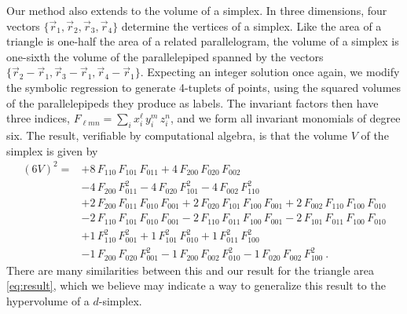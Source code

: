 \documentclass[10pt]{article}
\newcommand{\secbreak}{\bigskip{\centering\footnotesize $\triangle~~~\triangle~~~\triangle$\par}\bigskip\noindent}
\begin{document}
Our method also extends to the volume of a simplex. In three dimensions, four vectors $\{ \vec{r}_1, \vec{r}_2, \vec{r}_3, \vec{r}_4 \}$ determine the vertices of a simplex. 
Like the area of a triangle is one-half the area of a related parallelogram, the volume of a simplex is one-sixth the volume of the parallelepiped spanned by the vectors $\{ \vec{r}_2 - \vec{r}_1, \vec{r}_3 - \vec{r}_1, \vec{r}_4 - \vec{r}_1 \}$. 
Expecting an integer solution once again, we modify the symbolic regression to generate 4-tuplets of points, using the squared volumes of the parallelepipeds they produce as labels.
The invariant factors then have three indices, $F_{\ell m n} = \sum_i x_i^\ell \, y_i^m \, z_i^n$, and we form all invariant monomials of degree six.
The result, verifiable by computational algebra, is that the volume $V$ of the simplex is given by
\begin{align}
(6 V)^2 = &
+8 \, F_{110} \, F_{101} \, F_{011}
+4 \, F_{200} \, F_{020} \, F_{002}
\nonumber \\ &
-4 \, F_{200} \, F_{011}^2
-4 \, F_{020} \, F_{101}^2
-4 \, F_{002} \, F_{110}^2
\nonumber \\ &
+2 \, F_{200} \, F_{011} \, F_{010} \, F_{001}
+2 \, F_{020} \, F_{101} \, F_{100} \, F_{001}
+2 \, F_{002} \, F_{110} \, F_{100} \, F_{010}
\nonumber \\ &
-2 \, F_{110} \, F_{101} \, F_{010} \, F_{001}
-2 \, F_{110} \, F_{011} \, F_{100} \, F_{001}
-2 \, F_{101} \, F_{011} \, F_{100} \, F_{010}
\nonumber \\ &
+1 \, F_{110}^2 \, F_{001}^2
+1 \, F_{101}^2 \, F_{010}^2
+1 \, F_{011}^2 \, F_{100}^2
\nonumber \\ &
-1 \, F_{200} \, F_{020} \, F_{001}^2
-1 \, F_{200} \, F_{002} \, F_{010}^2
-1 \, F_{020} \, F_{002} \, F_{100}^2~.
\label{eq:simplex}
\end{align}
There are many similarities between this and our result for the triangle area \eqref{eq:result}, which we believe may indicate a way to generalize this result to the hypervolume of a $d$-simplex.

\secbreak
\end{document}
